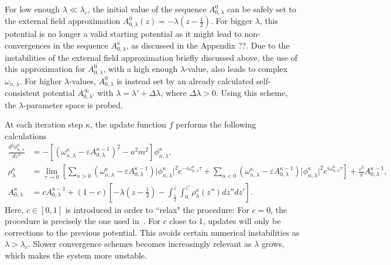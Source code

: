 For low enough $\lambda\ll \lambda_c$, the initial value of the sequence $A_{0,
\lambda}^0$  can be safely set to the external field approximation $A_{0,
\lambda}^0(z) = -\lambda \left(z- \frac{1}{2}\right).$ For bigger $\lambda$,
this potential is no longer a valid starting potential  as it might lead to
non-convergences in the sequence $ A_{0, \lambda}^{\kappa}$, as discussed in the Appendix
??. Due to the instabilities
of the external field approximation briefly discussed above, the use of this
approximation for $A_{0, \lambda}^{0}$, with a high enough $\lambda$-value,
also leads to complex $\omega_{n,\lambda}$. For higher $\lambda$-values,
$A_{0, \lambda}^{0}$ is instead set by an already calculated self-consistent
potential $A_{0, \lambda'}^{\infty}$ with $\lambda = \lambda' + \Delta
\lambda$, where $\Delta \lambda > 0$. Using this scheme, the
$\lambda$-parameter space is probed. 


At each iteration step $\kappa$, the update function $ f$ performs the
following calculations
\begin{subequations}
   \label{eq:iterative-procedure}
\begin{align}
    \frac{d {^2}\phi_{n, \lambda}^{\kappa}}{d {z^2}} {}  &= 
    -\left[ (\omega_{n, \lambda}^\kappa - \varepsilon A^{\kappa -1 }_{0, \lambda} )^2 
     - a^2 m^2\right] \phi_{n, \lambda}^{\kappa}, 
    \label{eq:mode-equation-iterative}
    \\
    \rho_\lambda^{\kappa} &= \lim_{\tau \to 0} \left[\sum_{n>0}^{} (\omega_{n,
        \lambda}^\kappa - \varepsilon A_{0, \lambda}^{\kappa-1} )\lvert \phi_{n,
        \lambda}^\kappa\rvert^2 e^{-i\omega^\kappa_{n, \lambda} \tau}
        +\sum_{n<0}^{} (\omega^{\kappa}_{n, \lambda} - \varepsilon
        A_{0, \lambda}^{\kappa-1}) \lvert \phi^\kappa_{n, \lambda}\rvert^2
    e^{i\omega^{\kappa}_{n, \lambda} \tau}\right] +
    \frac{\varepsilon^2}{\pi}
    A_{0, \lambda}^{\kappa-1} ,\\
    A^{\kappa }_{0, \lambda} &= c A_{0, \lambda}^{\kappa-1} + \left(1-c
        \right)\left[ -\lambda\left(z - \frac{1}{2} \right) -
            \int_{\frac{1}{2}}^{z} \int_{0}^{z'} \rho_\lambda^{\kappa}(z'') d z'' d
    z' \right] .
        \label{eq:A0-general-iterative}
\end{align}
\end{subequations}
Here, $c\in [0, 1]$ is introduced in order to ``relax" the procedure: For
$c=0$, the procedure is precisely the one used in~\cite[]{Ambjorn:1981xv}. For
$c$ close to 1, updates will only be corrections to the previous potential.
This avoids certain numerical instabilities as $\lambda   > \lambda_c$. 
Slower convergence schemes becomes increasingly relevant as $\lambda$ grows,
which makes the system more unstable.

